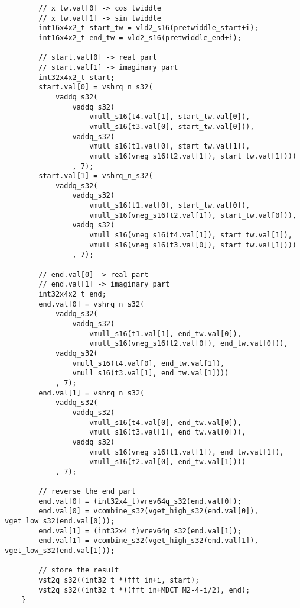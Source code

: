 \documentclass{article}
\begin{document}
\begin{lstlisting}
        // x_tw.val[0] -> cos twiddle
        // x_tw.val[1] -> sin twiddle
        int16x4x2_t start_tw = vld2_s16(pretwiddle_start+i);
        int16x4x2_t end_tw = vld2_s16(pretwiddle_end+i);

        // start.val[0] -> real part
        // start.val[1] -> imaginary part
        int32x4x2_t start;
        start.val[0] = vshrq_n_s32(
            vaddq_s32(
                vaddq_s32(
                    vmull_s16(t4.val[1], start_tw.val[0]),
                    vmull_s16(t3.val[0], start_tw.val[0])),
                vaddq_s32(
                    vmull_s16(t1.val[0], start_tw.val[1]),
                    vmull_s16(vneg_s16(t2.val[1]), start_tw.val[1])))
                , 7);
        start.val[1] = vshrq_n_s32(
            vaddq_s32(
                vaddq_s32(
                    vmull_s16(t1.val[0], start_tw.val[0]),
                    vmull_s16(vneg_s16(t2.val[1]), start_tw.val[0])),
                vaddq_s32(
                    vmull_s16(vneg_s16(t4.val[1]), start_tw.val[1]),
                    vmull_s16(vneg_s16(t3.val[0]), start_tw.val[1])))
                , 7);

        // end.val[0] -> real part
        // end.val[1] -> imaginary part
        int32x4x2_t end;
        end.val[0] = vshrq_n_s32(
            vaddq_s32(
                vaddq_s32(
                    vmull_s16(t1.val[1], end_tw.val[0]),
                    vmull_s16(vneg_s16(t2.val[0]), end_tw.val[0])),
            vaddq_s32(
                vmull_s16(t4.val[0], end_tw.val[1]),
                vmull_s16(t3.val[1], end_tw.val[1])))
            , 7);
        end.val[1] = vshrq_n_s32(
            vaddq_s32(
                vaddq_s32(
                    vmull_s16(t4.val[0], end_tw.val[0]),
                    vmull_s16(t3.val[1], end_tw.val[0])),
                vaddq_s32(
                    vmull_s16(vneg_s16(t1.val[1]), end_tw.val[1]),
                    vmull_s16(t2.val[0], end_tw.val[1])))
            , 7);

        // reverse the end part
        end.val[0] = (int32x4_t)vrev64q_s32(end.val[0]);
        end.val[0] = vcombine_s32(vget_high_s32(end.val[0]), vget_low_s32(end.val[0]));
        end.val[1] = (int32x4_t)vrev64q_s32(end.val[1]);
        end.val[1] = vcombine_s32(vget_high_s32(end.val[1]), vget_low_s32(end.val[1]));

        // store the result
        vst2q_s32((int32_t *)fft_in+i, start);
        vst2q_s32((int32_t *)(fft_in+MDCT_M2-4-i/2), end);
    }


\end{lstlisting}
\end{document}
